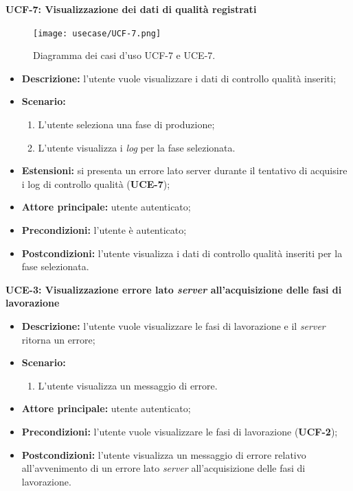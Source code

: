         \textbf{UCF-7: Visualizzazione dei dati di qualità registrati}
        \begin{figure}[H]
            \centering
            \texttt{[image: usecase/UCF-7.png]}
            \caption{Diagramma dei casi d'uso UCF-7 e UCE-7.}
        \end{figure}
        \begin{itemize}
            \item \textbf{Descrizione:} l’utente vuole visualizzare i dati di controllo qualità inseriti;
            \item \textbf{Scenario:}
                \begin{enumerate}
                    \item L’utente seleziona una fase di produzione;
                    \item L’utente visualizza i \textit{log} per la fase selezionata.
                \end{enumerate}
            \item \textbf{Estensioni:} si presenta un errore lato server durante il tentativo di acquisire i log di controllo qualità (\textbf{UCE-7});
            \item \textbf{Attore principale:} utente autenticato;
            \item \textbf{Precondizioni:} l’utente è autenticato;
            \item \textbf{Postcondizioni:} l’utente visualizza i dati di controllo qualità inseriti per la fase selezionata.
        \end{itemize}

        \textbf{UCE-3: Visualizzazione errore lato \textit{server} all’acquisizione delle fasi di lavorazione}
        \begin{itemize}
            \item \textbf{Descrizione:} l’utente vuole visualizzare le fasi di lavorazione e il \textit{server} ritorna un errore;
            \item \textbf{Scenario:}
                \begin{enumerate}
                    \item L’utente visualizza un messaggio di errore.
                \end{enumerate}
            \item \textbf{Attore principale:} utente autenticato;
            \item \textbf{Precondizioni:} l’utente vuole visualizzare le fasi di lavorazione (\textbf{UCF-2});
            \item \textbf{Postcondizioni:} l’utente visualizza un messaggio di errore relativo all’avvenimento di un errore lato \textit{server} all’acquisizione delle fasi di lavorazione.
        \end{itemize}

